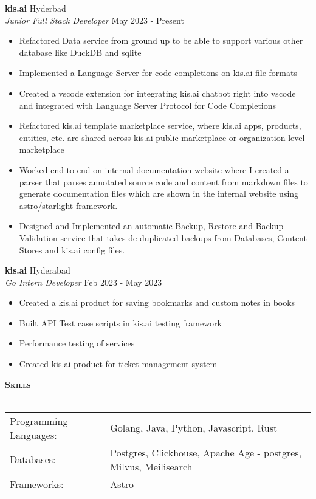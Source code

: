 \documentclass[a4paper]{article}
\newcommand{\lineunder} {
    \vspace*{-8pt} \\
    \hspace*{-18pt} \hrulefill \\
}
\newcommand{\header} [1] {
    {\hspace*{-18pt}\vspace*{6pt} \textbf{\textsc{#1}}}
    \vspace*{-6pt} \lineunder
}
\begin{document}
\textbf{kis.ai} \hfill Hyderbad\\
\textit{Junior Full Stack Developer} \hfill May 2023 - Present\\
\vspace{-1mm}
\begin{itemize} \itemsep 1pt
	\item Refactored Data service from ground up to be able to support various other database like DuckDB and sqlite
	\item Implemented a Language Server for code completions on kis.ai file formats
	\item Created a vscode extension for integrating kis.ai chatbot right into vscode and integrated with Language Server Protocol for Code Completions
	\item Refactored kis.ai template marketplace service, where kis.ai apps, products, entities, etc. are shared across kis.ai public marketplace or organization level marketplace
	\item Worked end-to-end on internal documentation website where I created a parser that parses annotated source code and content from markdown files to generate documentation files which are shown in the internal website using astro/starlight framework.
	\item Designed and Implemented an automatic Backup, Restore and Backup-Validation service that takes de-duplicated backups from Databases, Content Stores and kis.ai config files.
\end{itemize}
\textbf{kis.ai} \hfill Hyderabad\\
\textit{Go Intern Developer} \hfill Feb 2023 - May 2023\\
\vspace{-1mm}
\begin{itemize} \itemsep 1pt
	\item Created a kis.ai product for saving bookmarks and custom notes in books
	\item Built API Test case scripts in kis.ai testing framework
	\item Performance testing of services
	\item Created kis.ai product for ticket management system
\end{itemize}

\header{Skills}
\begin{tabular}{ l l }
	Programming Languages: & Golang, Java, Python, Javascript, Rust                           \\
	Databases:             & Postgres, Clickhouse, Apache Age - postgres, Milvus, Meilisearch \\
	Frameworks:            & Astro                                                            \\
\end{tabular}
\vspace{2mm}
\end{document}
